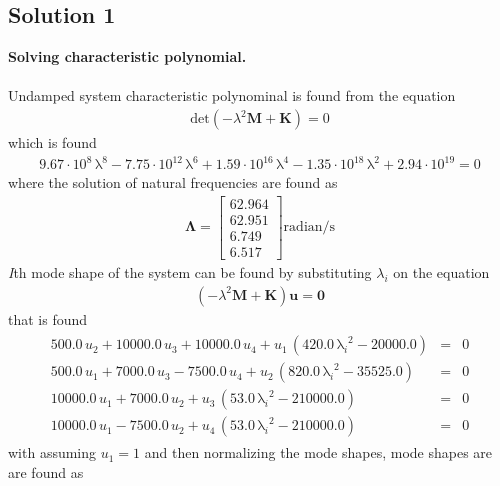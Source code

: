 \documentclass[]{report}
\begin{document}
\begin{center}
\subsection*{Solution 1}
\end{center}
\textbf{Solving characteristic polynomial.}\\~\\
Undamped system characteristic polynominal is found from the equation
\begin{eqnarray*}
\mathrm{det}\left(-\lambda^2\mathbf{M}+ \mathbf{K}\right)=0
\end{eqnarray*}
which is found 
\begin{eqnarray*}
9.67\cdot 10^8\, {\mathrm{\lambda}}^8 - 7.75\cdot 10^{12}\, {\mathrm{\lambda}}^6 + 1.59\cdot 10^{16}\, {\mathrm{\lambda}}^4 - 1.35\cdot 10^{18}\, {\mathrm{\lambda}}^2 + 2.94\cdot 10^{19}=0
\end{eqnarray*}
where the solution of natural frequencies are found as
\begin{eqnarray*}
{\mathbf{\Lambda}}=\left[\begin{array}{c} 62.964\\ 62.951\\ 6.749\\6.517 \end{array}\right]\mathrm{radian/s}
\end{eqnarray*}
\emph{I}th mode shape of the system can be found by substituting $\lambda_i$ on the equation 
\begin{eqnarray*}
\left(-\lambda^2\mathbf{M}+ \mathbf{K}\right)\mathbf{u}=\mathbf{0}
\end{eqnarray*}
that is found 
\begin{eqnarray*}
\begin{array}{ccc} 500.0\, u_{2} + 10000.0\, u_{3} + 10000.0\, u_{4} + u_{1}\, \left(420.0\, {\mathrm{\lambda}_i}^2 - 20000.0\right)&=& 0\\ 500.0\, u_{1} + 7000.0\, u_{3} - 7500.0\, u_{4} + u_{2}\, \left(820.0\, {\mathrm{\lambda}_i}^2 - 35525.0\right)&=& 0\\ 10000.0\, u_{1} + 7000.0\, u_{2} + u_{3}\, \left(53.0\, {\mathrm{\lambda}_i}^2 - 210000.0\right)&=& 0\\ 10000.0\, u_{1} - 7500.0\, u_{2} + u_{4}\, \left(53.0\, {\mathrm{\lambda}_i}^2 - 210000.0\right)&=& 0 \end{array}
\end{eqnarray*}
with assuming $u_1=1$ and then normalizing the mode shapes, mode shapes are are found as\\~\\
\end{document}
